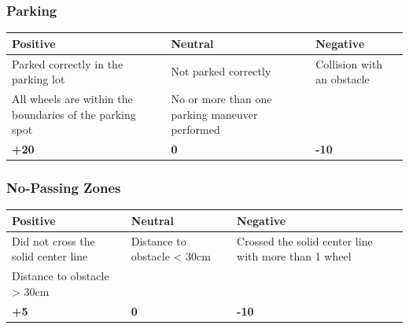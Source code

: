 
\subsubsection*{Parking}
\begin{table}[H]
	\begin{tabularx}{\textwidth}{XXX}
		\toprule
		\textbf{Positive}                                        & \textbf{Neutral}                               & \textbf{Negative}          \\
		\midrule
		Parked correctly in the parking lot                      & Not parked correctly                           & Collision with an obstacle \\
		All wheels are within the boundaries of the parking spot & No or more than one parking maneuver performed &                            \\
		\topstrut
		\textbf{+20}                                             & \textbf{0}                                     & \textbf{-10}               \\
		\bottomrule
	\end{tabularx}
\end{table}

\subsubsection*{No-Passing Zones}
\begin{table}[H]
	\begin{tabularx}{\textwidth}{XXX}
		\toprule
		\textbf{Positive}                   & \textbf{Neutral}            & \textbf{Negative}                                    \\
		\midrule
		Did not cross the solid center line & Distance to obstacle < 30cm & Crossed the solid center line with more than 1 wheel \\
		Distance to obstacle > 30cm         &                             &                                                      \\
		\topstrut
		\textbf{+5}                         & \textbf{0}                  & \textbf{-10}                                         \\
		\bottomrule
	\end{tabularx}
\end{table}

